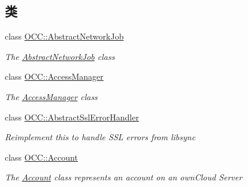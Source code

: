 \subsection*{类}
\begin{DoxyCompactItemize}
\item 
class \hyperlink{class_o_c_c_1_1_abstract_network_job}{O\+C\+C\+::\+Abstract\+Network\+Job}
\begin{DoxyCompactList}\small\item\em The \hyperlink{class_o_c_c_1_1_abstract_network_job}{Abstract\+Network\+Job} class \end{DoxyCompactList}\item 
class \hyperlink{class_o_c_c_1_1_access_manager}{O\+C\+C\+::\+Access\+Manager}
\begin{DoxyCompactList}\small\item\em The \hyperlink{class_o_c_c_1_1_access_manager}{Access\+Manager} class \end{DoxyCompactList}\item 
class \hyperlink{class_o_c_c_1_1_abstract_ssl_error_handler}{O\+C\+C\+::\+Abstract\+Ssl\+Error\+Handler}
\begin{DoxyCompactList}\small\item\em Reimplement this to handle S\+SL errors from libsync \end{DoxyCompactList}\item 
class \hyperlink{class_o_c_c_1_1_account}{O\+C\+C\+::\+Account}
\begin{DoxyCompactList}\small\item\em The \hyperlink{class_o_c_c_1_1_account}{Account} class represents an account on an own\+Cloud Server


\end{DoxyCompactList}
\end{DoxyCompactItemize}
